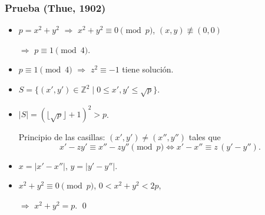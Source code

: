 \documentclass[handout]{beamer}
\newcommand{\ZZ}{\mathbb{Z}}
\begin{document}

\begin{frame}[fragile]
  \frametitle{Prueba (Thue, 1902)}


  \begin{itemize}
  \item<3-> $p = x^2 + y^2$ $\Longrightarrow$ $x^2 + y^2 \equiv 0 \pmod{p}$, $(x,y) \not\equiv (0,0)$

    $\Longrightarrow$ $p \equiv 1 \pmod{4}$.
  \end{itemize}


  \begin{itemize}
  \item<5-> $p \equiv 1 \pmod{4}$ $\Longrightarrow$ $z^2 \equiv -1$ tiene solución.

  \item<6-> $S = \{ (x', y') \in \ZZ^2 \mid 0 \le x', y' \le \sqrt{p} \}$.

  \item<7-> $|S| = (\lfloor \sqrt{p}\rfloor + 1)^2 > p$.

    Principio de las casillas: $(x',y') \ne (x'', y'')$ tales que
    \[ x' - zy' \equiv x'' - zy'' \pmod{p}
      \iff x' - x'' \equiv z\,(y' - y''). \]

  \item<8-> $x = |x' - x''|$, $y = |y' - y''|$.

  \item<9-> $x^2 + y^2 \equiv 0 \pmod{p}$, $0 < x^2 + y^2 < 2p$,

    $\Longrightarrow$ $x^2 + y^2 = p$. \qed
  \end{itemize}
\end{frame}

\end{document}
